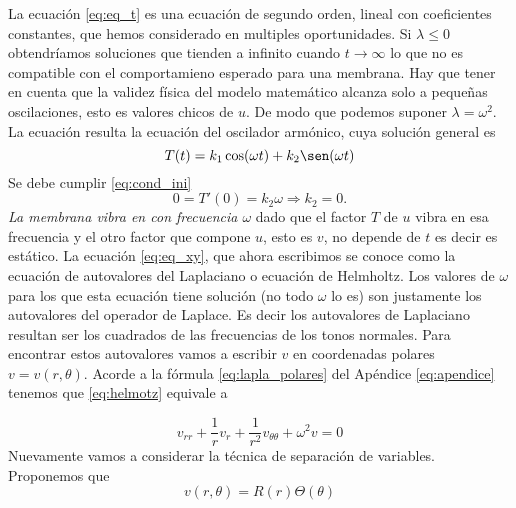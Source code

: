 La ecuación \eqref{eq:eq_t} es una ecuación de segundo orden, lineal con coeficientes constantes, que hemos considerado en multiples oportunidades. Si $\lambda\leq 0$ obtendríamos soluciones que tienden a infinito cuando $t\to\infty$ lo que no es compatible con el comportamieno esperado para una membrana. Hay que tener en cuenta que la validez física del modelo matemático alcanza solo a pequeñas oscilaciones, esto es valores chicos de $u$. De modo que podemos suponer $\lambda=\omega^2$. La ecuación resulta la ecuación del oscilador armónico, cuya solución general es
\[T(t)=k_1\cos(\omega t)+k_2\sen(\omega t)\]
Se debe cumplir \eqref{eq:cond_ini}
\[0=T'(0)=k_2\omega\Rightarrow \boxed{k_2=0}.\]
\emph{La membrana vibra en con frecuencia $\omega$} dado que el factor  $T$ de $u$ vibra en esa frecuencia y el otro factor que compone $u$, esto es $v$, no depende de $t$ es decir es estático. 
La ecuación \eqref{eq:eq_xy}, que ahora escribimos
se conoce como la ecuación de autovalores del Laplaciano o ecuación de Helmholtz.  Los valores de $\omega$ para los que esta ecuación tiene solución (no todo $\omega$ lo es)  son justamente los autovalores del operador de Laplace. Es decir los autovalores de Laplaciano resultan ser los cuadrados de las frecuencias de los tonos normales. Para encontrar estos autovalores vamos a escribir $v$ en coordenadas polares $v=v(r,\theta)$. Acorde a la fórmula \eqref{eq:lapla_polares} del Apéndice  \ref{eq:apendice} tenemos que \eqref{eq:helmotz} equivale a

\begin{equation}\label{eq:ecu_aux_1}v_{rr}+\frac{1}{r}v_r+\frac{1}{r^2}v_{\theta\theta}+\omega^2v=0
\end{equation}
Nuevamente vamos a considerar la técnica de separación de variables. Proponemos que
\[v(r,\theta)=R(r)\Theta(\theta)\]


